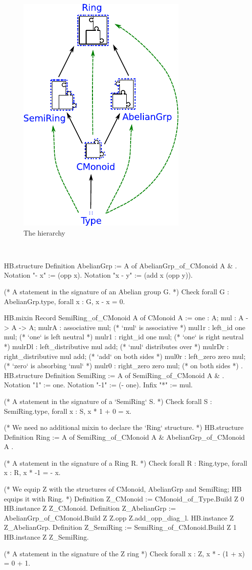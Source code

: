 \documentclass{easychair}
\begin{document}
\begin{figure}
  \vspace{1em}
  \includegraphics[width=.35\textwidth]{diagram.pdf}
  \vspace{-1.5em}
  \caption{The hierarchy}
  \label{fig:hierarchy}
\end{figure}
\
\begin{coqcode}
HB.structure Definition AbelianGrp := { A of AbelianGrp_of_CMonoid A & }.
Notation "- x"   := (opp x).
Notation "x - y" := (add x (opp y)).

(* A statement in the signature of an Abelian group G. *)
Check forall G : AbelianGrp.type, forall x : G, x - x = 0.

HB.mixin Record SemiRing_of_CMonoid A of CMonoid A := {
  one    : A;
  mul    : A -> A -> A;
  mulrA  : associative mul;  (* `mul` is associative   *)
  mul1r  : left_id one mul;  (* `one` is left neutral  *)
  mulr1  : right_id one mul; (* `one` is right neutral *)
  mulrDl : left_distributive mul add;  (* `mul` distributes over *)
  mulrDr : right_distributive mul add; (*   `add` on both sides  *)
  mul0r  : left_zero zero mul;  (* `zero` is absorbing `mul`     *)
  mulr0  : right_zero zero mul; (*   on both sides               *)
}.
HB.structure Definition SemiRing := { A of SemiRing_of_CMonoid A & }.
Notation "1"  := one.
Notation "-1" := (- one).
Infix    "*"  := mul.

(* A statement in the signature of a `SemiRing` S.  *)
Check forall S : SemiRing.type, forall x : S, x * 1 + 0 = x.

(* We need no additional mixin to declare the `Ring` structure. *)
HB.structure Definition Ring := { A of SemiRing_of_CMonoid A & AbelianGrp_of_CMonoid A }.

(* A statement in the signature of a Ring R.  *)
Check forall R : Ring.type, forall x : R, x * -1 = - x.

(* We equip Z with the structures of CMonoid, AbelianGrp and SemiRing; HB equips it with Ring. *)
Definition Z_CMonoid    := CMonoid_of_Type.Build Z 0%
HB.instance Z Z_CMonoid.
Definition Z_AbelianGrp := AbelianGrp_of_CMonoid.Build Z Z.opp Z.add_opp_diag_l.
HB.instance Z Z_AbelianGrp.
Definition Z_SemiRing   := SemiRing_of_CMonoid.Build Z 1%
HB.instance Z Z_SemiRing.

(* A statement in the signature of the Z ring *)
Check forall x : Z, x * - (1 + x) = 0 + 1.
\end{coqcode}
\end{document}
